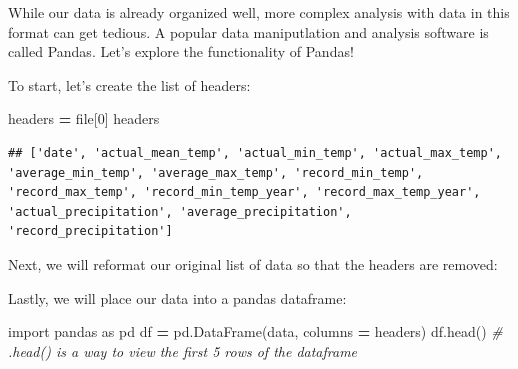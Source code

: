 \documentclass[]{book}
\newenvironment{Shaded}{\begin{snugshade}}{\end{snugshade}}
\newcommand{\KeywordTok}[1]{\textcolor[rgb]{0.13,0.29,0.53}{\textbf{#1}}}
\newcommand{\DecValTok}[1]{\textcolor[rgb]{0.00,0.00,0.81}{#1}}
\newcommand{\SpecialCharTok}[1]{\textcolor[rgb]{0.00,0.00,0.00}{#1}}
\newcommand{\StringTok}[1]{\textcolor[rgb]{0.31,0.60,0.02}{#1}}
\newcommand{\ImportTok}[1]{#1}
\newcommand{\CommentTok}[1]{\textcolor[rgb]{0.56,0.35,0.01}{\textit{#1}}}
\newcommand{\ControlFlowTok}[1]{\textcolor[rgb]{0.13,0.29,0.53}{\textbf{#1}}}
\newcommand{\OperatorTok}[1]{\textcolor[rgb]{0.81,0.36,0.00}{\textbf{#1}}}
\newcommand{\BuiltInTok}[1]{#1}
\newcommand{\NormalTok}[1]{#1}
\begin{document}
While our data is already organized well, more complex analysis with
data in this format can get tedious. A popular data maniputlation and
analysis software is called Pandas. Let's explore the functionality of
Pandas!

To start, let's create the list of headers:

\begin{Shaded}
\begin{Highlighting}[]
\NormalTok{headers }\OperatorTok{=} \BuiltInTok{file}\NormalTok{[}\DecValTok{0}\NormalTok{]}
\NormalTok{headers}
\end{Highlighting}
\end{Shaded}

\begin{verbatim}
## ['date', 'actual_mean_temp', 'actual_min_temp', 'actual_max_temp', 'average_min_temp', 'average_max_temp', 'record_min_temp', 'record_max_temp', 'record_min_temp_year', 'record_max_temp_year', 'actual_precipitation', 'average_precipitation', 'record_precipitation']
\end{verbatim}

Next, we will reformat our original list of data so that the headers are
removed:

\begin{Shaded}
\end{Shaded}

Lastly, we will place our data into a pandas dataframe:

\begin{Shaded}
\begin{Highlighting}[]
\ImportTok{import}\NormalTok{ pandas }\ImportTok{as}\NormalTok{ pd}
\NormalTok{df }\OperatorTok{=}\NormalTok{ pd.DataFrame(data, columns }\OperatorTok{=}\NormalTok{ headers)}
\NormalTok{df.head()     }\CommentTok{# .head() is a way to view the first 5 rows of the dataframe}
\end{Highlighting}
\end{Shaded}
\end{document}
